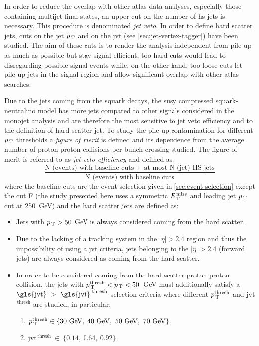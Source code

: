 In order to reduce the overlap with other \gls{atlas} data analyses, especially
those containing multijet final states, an upper cut on the number of \gls{hs}
jets is necessary. This procedure is denominated \emph{jet veto}. In order to
define hard scatter jets, cuts on the jet $p_\mathrm{\, T}$ and on the \gls{jvt} (see
\cref{sec:jet-vertex-tagger}) have been studied. The aim of these cuts is to
render the analysis independent from pile-up as much as possible but stay signal
efficient, too hard cuts would lead to disregarding possible signal events
while, on the other hand, too loose cuts let pile-up jets in the signal region
and allow significant overlap with other \gls{atlas} searches.

Due to the jets coming from the squark decays, the \gls{susy} compressed
squark-neutralino model has more jets compared to other signals considered in
the monojet analysis and are therefore the most sensitive to jet veto efficiency
and to the definition of hard scatter jet. To study the pile-up contamination
for different $p_\mathrm{\, T}$ thresholds a \emph{figure of merit} is defined and its
dependence from the average number of proton-proton collisions per bunch
crossing studied. The figure of merit is referred to as \emph{jet veto
  efficiency } and defined as:
\begin{equation}
  \label{eq:fig_merit}
  \frac{\text{N (events) with baseline cuts + at
      most N (jet) HS jets}}{\text{N (events)
      with baseline cuts}}
\end{equation}
where the baseline cuts are the event selection given in
\cref{sec:event-selection} except the cut F (the study presented here uses a
symmetric $E_\mathrm{\, T}^\mathrm{\, miss}$ and leading jet $p_\mathrm{\, T}$ cut at 250~GeV) and the hard scatter jets
are defined as:
\begin{itemize}
\item Jets with $p_\mathrm{\, T} > 50$ GeV is always considered coming from the hard
  scatter.
\item Due to the lacking of a tracking system in the $|\eta| > 2.4$ region and
  thus the impossibility of using a \gls{jvt} criteria, jets belonging to the
  $|\eta| > 2.4$ (forward jets) are always considered as coming from the hard
  scatter.
\item In order to be considered coming from the hard scatter proton-proton
  collision, the jets with $p_\mathrm{\, T}^{\mathrm{thresh}} < p_\mathrm{\, T} < 50$~GeV must
  additionally satisfy a
  $\mathrm{\gls{jvt}}~>~\mathrm{\gls{jvt}}^{\text{ thresh}}$ selection criteria
  where different $p_\mathrm{\, T}^{\mathrm{thresh}}$ and \gls{jvt}$^{\mathrm{\, thresh}}$
  are studied, in particular:
  \begin{enumerate}[A -]
  \item
    $p_\mathrm{\, T}^{\mathrm{thresh}} \in
    \{30~\mathrm{GeV},~40~\mathrm{GeV},~50~\mathrm{GeV}, ~70~\mathrm{GeV}\}$,
  \item \gls{jvt}$^{\mathrm{\, thresh}}~\in~ \{0.14,~0.64,~0.92\}$.
  \end{enumerate}
\end{itemize}


